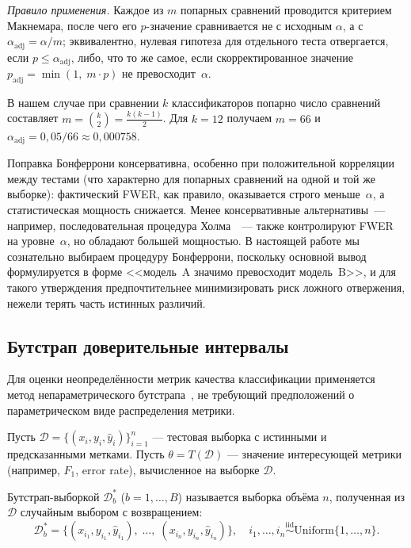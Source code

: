 \emph{Правило применения.} Каждое из $m$ попарных сравнений
проводится критерием Макнемара, после чего его $p$-значение сравнивается
не с исходным $\alpha$, а с $\alpha_{\mathrm{adj}} = \alpha / m$;
эквивалентно, нулевая гипотеза для отдельного теста отвергается, если
$p \leqslant \alpha_{\mathrm{adj}}$, либо, что то же самое, если
скорректированное значение $p_{\mathrm{adj}} = \min(1,\; m\cdot p)$
не превосходит~$\alpha$.

В нашем случае при сравнении $k$ классификаторов попарно число
сравнений составляет $m = \binom{k}{2} = \frac{k(k-1)}{2}$. Для $k = 12$
получаем $m = 66$ и $\alpha_{\mathrm{adj}} = 0{,}05 / 66 \approx 0{,}000758$.

Поправка Бонферрони консервативна, особенно при положительной корреляции
между тестами (что характерно для попарных сравнений на одной и той же
выборке): фактический FWER, как правило, оказывается строго меньше~$\alpha$,
а статистическая мощность снижается. Менее консервативные альтернативы~---
например, последовательная процедура Холма~\cite{holm1979simple}~--- также
контролируют FWER на уровне~$\alpha$, но обладают большей мощностью.
В настоящей работе мы сознательно выбираем процедуру Бонферрони, поскольку
основной вывод формулируется в форме <<модель~A значимо превосходит
модель~B>>, и для такого утверждения предпочтительнее минимизировать риск
ложного отвержения, нежели терять часть истинных различий.


\subsection{Бутстрап доверительные интервалы}
\label{subsec:bootstrap}

Для оценки неопределённости метрик качества классификации применяется
метод непараметрического бутстрапа~\cite{efron1979bootstrap}, не
требующий предположений о параметрическом виде распределения метрики.

Пусть $\mathcal{D} = \{(x_i, y_i, \hat{y}_i)\}_{i=1}^{n}$ ---
тестовая выборка с истинными и предсказанными метками. Пусть
$\theta = T(\mathcal{D})$ --- значение интересующей метрики
(например, $F_1$, error rate), вычисленное на выборке $\mathcal{D}$.

\begin{definition}
\label{def:bootstrap-sample}
Бутстрап-выборкой $\mathcal{D}^{*}_b$ ($b = 1, \ldots, B$) называется
выборка объёма $n$, полученная из $\mathcal{D}$ случайным выбором с
возвращением:
\begin{equation}
    \mathcal{D}^{*}_b = \bigl\{(x_{i_1}, y_{i_1}, \hat{y}_{i_1}),\;
    \ldots,\; (x_{i_n}, y_{i_n}, \hat{y}_{i_n})\bigr\},
    \quad i_1, \ldots, i_n \stackrel{\mathrm{iid}}{\sim}
    \mathrm{Uniform}\{1, \ldots, n\}.
    \label{eq:bootstrap-sample}
\end{equation}
\end{definition}

